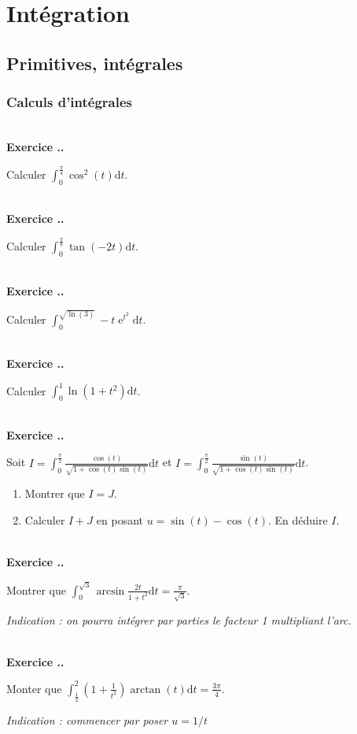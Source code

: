 \documentclass{article}
\newcommand{\di}{\mathrm{d}}
\newcommand{\ex}{{\operatorname{e}}}
\newcounter{exo}
\newcommand{\exercice}[1][\null]{\textbf{\\ Exercice \thesection.\theexo. #1} \addtocounter{exo}{1}}
\begin{document}
\section{Intégration}

\subsection{Primitives, intégrales}

\subsubsection{Calculs d'intégrales}

\exercice

Calculer $\displaystyle \int_{0}^{\frac{\pi}{4}} \cos^2(t) \di t$.

\exercice

Calculer $\displaystyle \int_{0}^{\frac{\pi}{8}} \tan(-2t) \di t$.

\exercice

Calculer $\displaystyle \int_{0}^{\sqrt{\ln(3)}} -t\ex^{t^2} \di t$.

\exercice

Calculer $\displaystyle \int_0^1 \ln(1+t^2) \di t$.


\exercice

Soit $\displaystyle I = \int_{0}^{\frac{\pi}{2}} \frac{\cos(t)}{\sqrt{1+ \cos(t) \sin(t)}} \di t$ et $\displaystyle I = \int_{0}^{\frac{\pi}{2}} \frac{\sin(t)}{\sqrt{1+ \cos(t) \sin(t)}} \di t$.

\begin{enumerate}

\item Montrer que $I = J$.

\item Calculer $I+J$ en posant $u = \sin(t) - \cos(t)$. En déduire $I$.

\end{enumerate}


\exercice
Montrer que $\displaystyle \int_{0}^{\sqrt{3}} \arcsin \frac{2t}{1+t^2} \di t = \frac{\pi}{\sqrt{3}}$.

\emph{Indication : on pourra intégrer par parties le facteur 1 multipliant l'arc.}


\exercice

Monter que $\displaystyle \int_{\frac{1}{2}}^2 \left(1+\frac{1}{t^2}\right) \arctan (t) \di t = \frac{3 \pi}{4}$.

\emph{Indication : commencer par poser $u = 1/t$}
\end{document}
